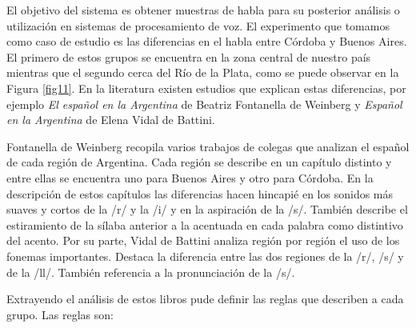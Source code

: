 El objetivo del sistema es obtener muestras de habla para su posterior análisis o utilización en sistemas de procesamiento de voz. El experimento que tomamos como caso de estudio es las diferencias en el habla entre Córdoba y Buenos Aires. El primero de estos grupos se encuentra en la zona central de nuestro país mientras que el segundo cerca del Río de la Plata, como se puede observar en la Figura \ref{fig11}. En la literatura existen estudios que explican estas diferencias, por ejemplo \textit{El español en la Argentina} \cite{Fontanella2000} de Beatriz Fontanella de Weinberg y \textit{Español en la Argentina} \cite{Vidal1964} de Elena Vidal de Battini. 

Fontanella de Weinberg recopila varios trabajos de colegas que analizan el español de cada región de Argentina. Cada región se describe en un capítulo distinto y entre ellas se encuentra uno para Buenos Aires y otro para Córdoba. En la descripción de estos capítulos las diferencias hacen hincapié en los sonidos más suaves y cortos de la /r/ y la /i/ y en la aspiración de la /s/. También describe el estiramiento de la sílaba anterior a la acentuada en cada palabra como distintivo del acento. Por su parte, Vidal de Battini analiza región por región el uso de los fonemas importantes. Destaca la diferencia entre las dos regiones de la /r/, /s/ y de la /ll/. También referencia a la pronunciación de la /s/.

Extrayendo el análisis de estos libros pude definir las reglas que describen a cada grupo. Las reglas son: 

